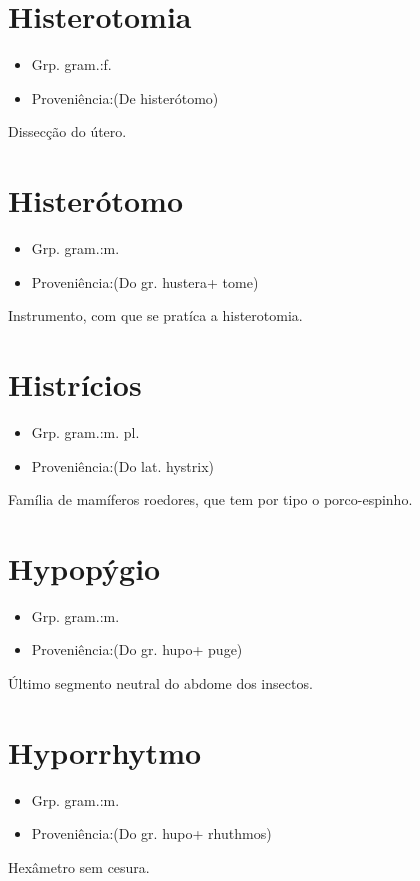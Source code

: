 \documentclass{article}
\begin{document}
\section{Histerotomia}
\begin{itemize}
\item {Grp. gram.:f.}
\end{itemize}
\begin{itemize}
\item {Proveniência:(De \textunderscore histerótomo\textunderscore )}
\end{itemize}
Dissecção do útero.
\section{Histerótomo}
\begin{itemize}
\item {Grp. gram.:m.}
\end{itemize}
\begin{itemize}
\item {Proveniência:(Do gr. \textunderscore hustera\textunderscore  + \textunderscore tome\textunderscore )}
\end{itemize}
Instrumento, com que se pratíca a histerotomia.
\section{Histrícios}
\begin{itemize}
\item {Grp. gram.:m. pl.}
\end{itemize}
\begin{itemize}
\item {Proveniência:(Do lat. \textunderscore hystrix\textunderscore )}
\end{itemize}
Família de mamíferos roedores, que tem por tipo o porco-espinho.
\section{Hypopýgio}
\begin{itemize}
\item {Grp. gram.:m.}
\end{itemize}
\begin{itemize}
\item {Proveniência:(Do gr. \textunderscore hupo\textunderscore  + \textunderscore puge\textunderscore )}
\end{itemize}
Último segmento neutral do abdome dos insectos.
\section{Hyporrhytmo}
\begin{itemize}
\item {Grp. gram.:m.}
\end{itemize}
\begin{itemize}
\item {Proveniência:(Do gr. \textunderscore hupo\textunderscore  + \textunderscore rhuthmos\textunderscore )}
\end{itemize}
Hexâmetro sem cesura.
\end{document}
